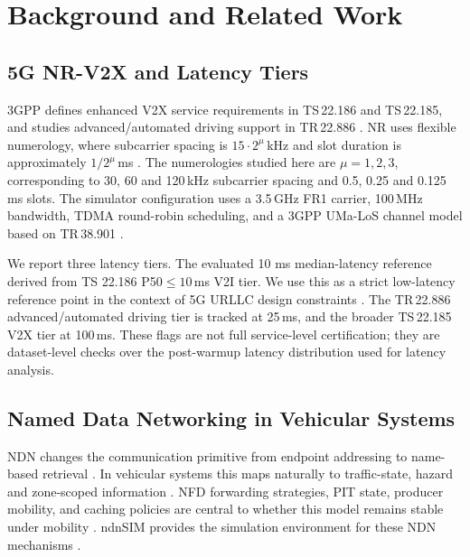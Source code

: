 \documentclass[journal]{IEEEtran}
\begin{document}
\section{Background and Related Work}
\label{sec:related}

\subsection{5G NR-V2X and Latency Tiers}

3GPP defines enhanced V2X service requirements in TS\,22.186 and TS\,22.185, and studies advanced/automated driving support in TR\,22.886 \cite{ref:v2x-3gpp22186,ref:v2x-3gpp22185,ref:v2x-3gpp22886}. NR uses flexible numerology, where subcarrier spacing is $15\cdot2^\mu$\,kHz and slot duration is approximately $1/2^\mu$\,ms \cite{ref:nr-phy}. The numerologies studied here are $\mu=1,2,3$, corresponding to 30, 60 and 120\,kHz subcarrier spacing and 0.5, 0.25 and 0.125\,ms slots. The simulator configuration uses a 3.5\,GHz FR1 carrier, 100\,MHz bandwidth, TDMA round-robin scheduling, and a 3GPP UMa-LoS channel model based on TR\,38.901 \cite{ref:nr-channel}.

We report three latency tiers. The evaluated 10 ms median-latency reference derived from TS 22.186 P50$\le10$\,ms V2I tier. We use this as a strict low-latency reference point in the context of 5G URLLC design constraints \cite{ref:5g-urllc}. The TR\,22.886 advanced/automated driving tier is tracked at 25\,ms, and the broader TS\,22.185 V2X tier at 100\,ms. These flags are not full service-level certification; they are dataset-level checks over the post-warmup latency distribution used for latency analysis.

\subsection{Named Data Networking in Vehicular Systems}

NDN changes the communication primitive from endpoint addressing to name-based retrieval \cite{ref:ndn-overview}. In vehicular systems this maps naturally to traffic-state, hazard and zone-scoped information \cite{ref:vndn,ref:ndn-v2x-survey}. NFD forwarding strategies, PIT state, producer mobility, and caching policies are central to whether this model remains stable under mobility \cite{ref:ndn-mobility,ref:ndn-cache-survey}. ndnSIM provides the simulation environment for these NDN mechanisms \cite{ref:ndnsim}.
\end{document}
